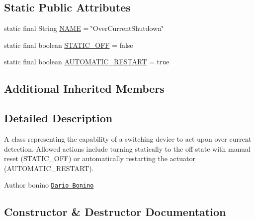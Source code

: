 \subsection*{Static Public Attributes}
\begin{DoxyCompactItemize}
\item 
static final String \hyperlink{classit_1_1polito_1_1elite_1_1enocean_1_1enj_1_1eep_1_1eep26_1_1attributes_1_1_e_e_p26_over_current_shutdown_a5aab26c76d2fb5ca4885bec7823f34b5}{N\+A\+ME} = \char`\"{}Over\+Current\+Shutdown\char`\"{}
\item 
static final boolean \hyperlink{classit_1_1polito_1_1elite_1_1enocean_1_1enj_1_1eep_1_1eep26_1_1attributes_1_1_e_e_p26_over_current_shutdown_a64a20898d0d1635e4da5448aed94488a}{S\+T\+A\+T\+I\+C\+\_\+\+O\+FF} = false
\item 
static final boolean \hyperlink{classit_1_1polito_1_1elite_1_1enocean_1_1enj_1_1eep_1_1eep26_1_1attributes_1_1_e_e_p26_over_current_shutdown_a967f38f9f2fde07fbfd19a1a3b423fe2}{A\+U\+T\+O\+M\+A\+T\+I\+C\+\_\+\+R\+E\+S\+T\+A\+RT} = true
\end{DoxyCompactItemize}
\subsection*{Additional Inherited Members}


\subsection{Detailed Description}
A class representing the capability of a switching device to act upon over current detection. Allowed actions include turning statically to the off state with manual reset (S\+T\+A\+T\+I\+C\+\_\+\+O\+FF) or automatically restarting the actuator (A\+U\+T\+O\+M\+A\+T\+I\+C\+\_\+\+R\+E\+S\+T\+A\+RT).

\begin{DoxyAuthor}{Author}
bonino \href{mailto:dario.bonino@gmail.com}{\tt Dario Bonino} 
\end{DoxyAuthor}


\subsection{Constructor \& Destructor Documentation}
\hypertarget{classit_1_1polito_1_1elite_1_1enocean_1_1enj_1_1eep_1_1eep26_1_1attributes_1_1_e_e_p26_over_current_shutdown_a8ba70c146c7e62e283b7ffd2a1bb36ed}{}\label{classit_1_1polito_1_1elite_1_1enocean_1_1enj_1_1eep_1_1eep26_1_1attributes_1_1_e_e_p26_over_current_shutdown_a8ba70c146c7e62e283b7ffd2a1bb36ed} 
